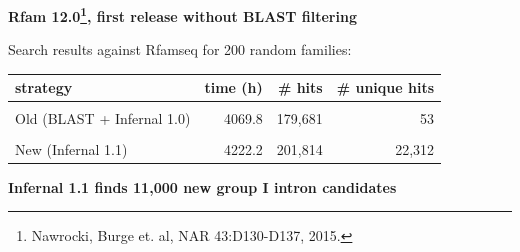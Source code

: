 \documentclass[landscape]{slides}
\begin{document}
\begin{slide}
\begin{slide}

\vfill
\end{slide}
\begin{slide}
\begin{center}

\textbf{Rfam 12.0\footnote{Nawrocki, Burge et. al, NAR 43:D130-D137, 2015.}, 
first release without BLAST filtering}

\end{center}

\begin{center}
Search results against Rfamseq for 200 random families:

\medskip

\begin{tabular}{l|r|r|r}
strategy                   & time (h) & \# hits & \# unique hits \\ \hline
& & & \\
Old (BLAST + Infernal 1.0) & 4069.8   &  179,681 & 53 \\
& & & \\
New (Infernal 1.1)         & 4222.2   &  201,814 & 22,312 \\
\end{tabular}
\end{center}

\vfill
\end{slide}
%
%
\begin{slide}
\begin{center}
\textbf{Infernal 1.1 finds 11,000 new group I intron candidates}
\end{center}


\end{slide}
\end{slide}
\end{document}
